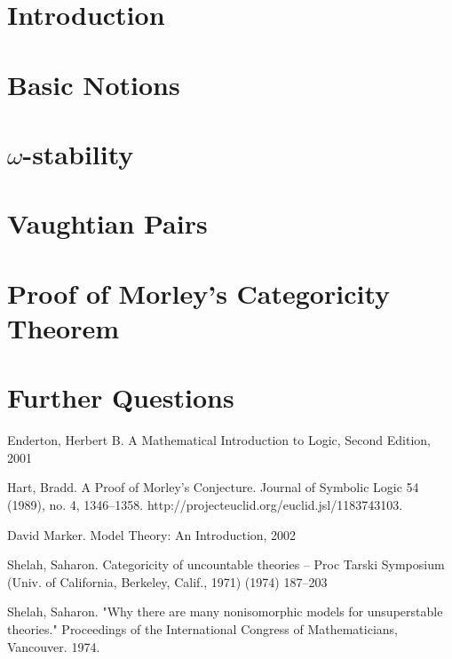 \documentclass[12pt]{article}
\theoremstyle{definition}
\theoremstyle{definition}
\theoremstyle{plain}
\theoremstyle{remark}
\numberwithin{equation}{section}
\begin{document}

%
%
\tableofcontents
\newpage

\pagestyle{myheadings} \markright{}

%

\section{Introduction}

\newpage

\section{Basic Notions}

\newpage

\section{\(\omega\)-stability}

\newpage

\section{Vaughtian Pairs}

\newpage

\section{Proof of Morley's Categoricity Theorem}

\newpage

\section{Further Questions}

\newpage

%

\begin{thebibliography} \small
%
Enderton, Herbert B. A Mathematical Introduction to Logic, Second Edition, 2001 

Hart, Bradd. A Proof of Morley's Conjecture. Journal of Symbolic Logic 54 (1989), no. 4, 1346--1358. http://projecteuclid.org/euclid.jsl/1183743103.

 David Marker. Model Theory: An Introduction, 2002

 Shelah, Saharon. Categoricity of uncountable theories -- Proc Tarski Symposium (Univ. of California, Berkeley, Calif., 1971) (1974) 187--203

 Shelah, Saharon. "Why there are many nonisomorphic models for unsuperstable theories." Proceedings of the International Congress of Mathematicians, Vancouver. 1974.

%
\end{thebibliography}
\end{document}
